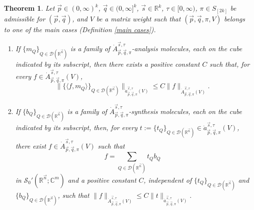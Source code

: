 \documentclass[11pt, reqno]{amsart}
\newtheorem{theorem}{Theorem}[section]
\theoremstyle{definition}
\theoremstyle{remark}
\numberwithin{equation}{section}
\newcommand{\C}{\mathbb C}
\newcommand{\R}{\mathbb R}
\newcommand{\vp}{\vec p}
\newcommand{\vq}{\vec q}
\newcommand{\vs}{\vec s}
\newcommand{\Atau}{\dot A^{\vs,\tau}_{\vp,\vq,\pi}}
\newcommand{\atau}{\dot a^{\vs,\tau}_{\vp,\vq,\pi}}
\begin{document}
\begin{theorem}\label{89}
Let $\vp\in(0,\infty)^k$, $\vq\in(0,\infty]^k$, $\vs\in\R^k$, $\tau\in[0,\infty)$,
$\pi\in S_{[2k]}$ be admissible for $(\vp,\vq)$,
and $V$ be a matrix weight such that $(\vp,\vq,\pi,V)$ belongs
to one of the main cases (Definition \ref{main cases}).
\begin{enumerate}[{\rm (i)}]
\item\label{890} If $\{m_Q\}_{Q\in\mathscr{D}(\mathbb R^{\vec n})}$
is a family of $\dot A^{\vec s,\tau}_{\vec p,\vec q,\pi}$-analysis molecules, each on the cube indicated by its subscript,
then there exists a positive constant $C$ such that,
for every $f\in\Atau(V)$,
$$
\Big\|\Big\{\Big\langle f,
m_Q\Big\rangle\Big\}_{Q\in\mathscr{D}(\mathbb R^{\vec n})}\Big\|_{\atau(V)}
\leq C\|f\|_{\Atau(V)}.
$$

\item\label{892}
If $\{b_Q\}_{Q\in\mathscr{D}(\mathbb R^{\vec n})}$
is a family of $\dot A^{\vec s,\tau}_{\vec p,\vec q,\pi}$-synthesis molecules,
each on the cube indicated by its subscript,
then, for every $t:=\{t_Q\}_{Q\in\mathscr{D}(\mathbb R^{\vec n})}
\in\atau(V)$, there exist $f\in\Atau(V)$ such that
$$
f=\sum_{Q\in\mathscr{D}(\mathbb R^{\vec n})} t_Qb_Q
$$
in $\mathscr{S}_0'(\mathbb R^{\vec n};\C^m)$ and a positive constant $C$,
independent of $\{t_Q\}_{Q\in\mathscr{D}(\mathbb R^{\vec n})}$
and $\{b_Q\}_{Q\in\mathscr{D}(\mathbb R^{\vec n})}$, such that
$\|f\|_{\Atau(V)}
\leq C\|t\|_{\atau(V)}.$
\end{enumerate}
\end{theorem}
\end{document}
